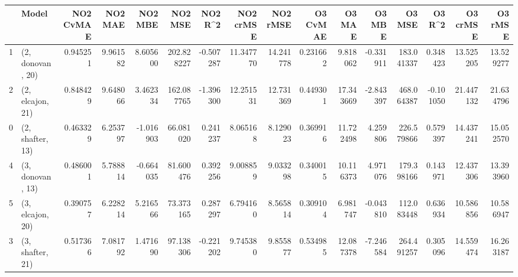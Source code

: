 \begin{tabular}{llrrrrrrrrrrrrrr}
\toprule
{} &             Model &  NO2 CvMAE &   NO2 MAE &   NO2 MBE &     NO2 MSE &   NO2 R\textasciicircum2 &  NO2 crMSE &   NO2 rMSE &  O3 CvMAE &     O3 MAE &    O3 MBE &      O3 MSE &    O3 R\textasciicircum2 &   O3 crMSE &    O3 rMSE \\
\midrule
1 &  (2, donovan, 20) &   0.945251 &  9.961582 &  8.605600 &  202.828227 & -0.507287 &  11.347770 &  14.241778 &  0.231662 &   9.818062 & -0.331911 &  183.041337 &  0.348423 &  13.525205 &  13.529277 \\
2 &  (2, elcajon, 21) &   0.848429 &  9.648066 &  3.462334 &  162.087765 & -1.396300 &  12.251531 &  12.731369 &  0.449301 &  17.343669 & -2.843397 &  468.064387 & -0.101050 &  21.447132 &  21.634796 \\
0 &  (2, shafter, 13) &   0.463329 &  6.253797 & -1.016903 &   66.081020 &  0.241237 &   8.065168 &   8.129023 &  0.369916 &  11.722498 &  4.259806 &  226.579866 &  0.579397 &  14.437241 &  15.052570 \\
4 &  (3, donovan, 13) &   0.486001 &  5.788814 & -0.664035 &   81.600476 &  0.392256 &   9.008859 &   9.033298 &  0.340015 &  10.116373 &  4.971076 &  179.398166 &  0.143971 &  12.437306 &  13.393960 \\
5 &  (3, elcajon, 20) &   0.390757 &  6.228214 &  5.216566 &   73.373165 &  0.287297 &   6.794160 &   8.565814 &  0.309104 &   6.981747 & -0.043810 &  112.083448 &  0.636934 &  10.586856 &  10.586947 \\
3 &  (3, shafter, 21) &   0.517366 &  7.081792 &  1.471690 &   97.138306 & -0.221202 &   9.745380 &   9.855877 &  0.534985 &  12.087378 & -7.246584 &  264.491257 &  0.305096 &  14.559474 &  16.263187 \\
\bottomrule
\end{tabular}

